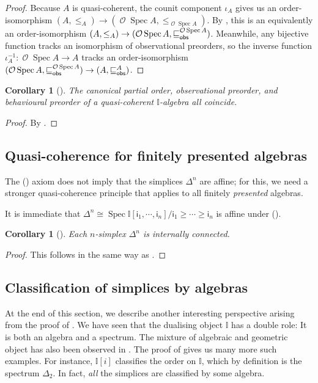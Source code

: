 \documentclass[a4paper,12pt]{amsart}
\newtheorem{corollary}[theorem]{Corollary}
\theoremstyle{definition}
\newcommand{\mc}[1]{\mathcal{#1}}
\newcommand{\mbb}[1]{\mathbb{#1}}
\newcommand{\I}{\mbb I}
\newcommand{\ms}[1]{\mathsf{#1}}
\newcommand{\spec}{\operatorname{Spec}}
\newcommand{\opens}{\operatorname{\mc{O}}} %
\begin{document}
\begin{proof}
  Because $A$ is quasi-coherent, the counit component $\iota_A$ gives us an order-isomorphism ${(A,\le_A)}\to (\opens\spec{A},\le_{\opens\spec{A}})$. By , this is an equivalently an order-isomorphism ${(A,\le_A)}\to {(\opens\spec{A},\obsle[\opens\spec{A}])}$. Meanwhile, any bijective function tracks an isomorphism of observational preorders, so the inverse function $\iota_A^{-1}\colon \opens\spec{A}\to A$ tracks an order-isomorphism  ${(\opens\spec{A},\obsle[\opens\spec{A}])}\to {(A,\obsle[A])}$. 
\end{proof}

\begin{corollary}[\AxiomSQCP]
  The canonical partial order, observational preorder, and behavioural preorder of a quasi-coherent $\I$-algebra all coincide.
\end{corollary}

\begin{proof}
  By .
\end{proof}


\subsection{Quasi-coherence for finitely presented algebras}

The (\AxiomSQCP) axiom does not imply that the simplices $\Delta^n$ are affine; for this, we need a stronger quasi-coherence principle that applies to all finitely \emph{presented} algebras.


\PrintAxiomSQCF

It is immediate that $\Delta^n\cong \spec\I[\ms{i}_1,\cdots,\ms{i}_n]/\ms{i}_1\geq \cdots \geq \ms{i}_n$ is affine under (\AxiomSQCF).

\begin{corollary}[\AxiomSQCF]
  Each $n$-simplex $\Delta^n$ is internally connected.
\end{corollary}

\begin{proof}
  This follows in the same way as .
\end{proof}

\subsection{Classification of simplices by algebras}

At the end of this section, we describe another interesting perspective arising from the proof of . We have seen that the dualising object $\I$ has a double role: It is both an algebra and a spectrum. The mixture of algebraic and geometric object has also been observed in . The proof of  gives us many more such examples. For instance, $\I[i]$ classifies the order on $\I$, which by definition is the spectrum $\Delta_2$. In fact, \emph{all} the simplices are classified by some algebra.
\end{document}

